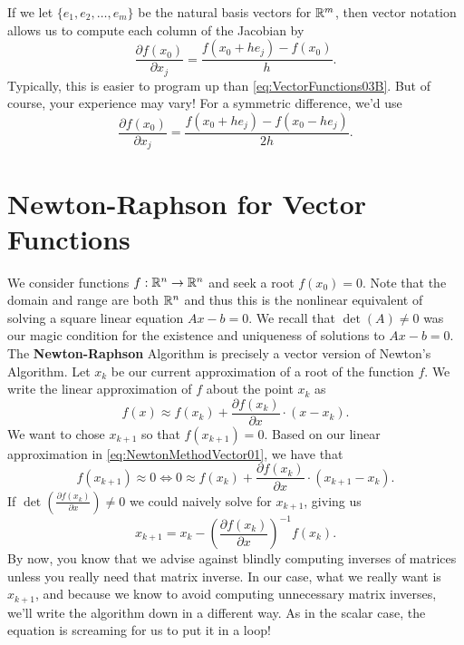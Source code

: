 \begin{tcolorbox}[title=\textbf{Compact Way to Numerically Approximate the Jacobian}]
If we let $\{e_1, e_2, \ldots, e_m \}$ be the natural basis vectors for $\mathbb R^m$, then vector notation allows us to compute each column of the Jacobian by 
\begin{equation}
    \label{eq:SummaryGradient01A}
    \frac{\partial f(x_0)}{\partial x_j} = \frac{f(x_0+h e_j)-f(x_0)}{h}.
    \end{equation}
    Typically, this is easier to program up than \eqref{eq:VectorFunctions03B}. But of course, your experience may vary! For a symmetric difference, we'd use
    \begin{equation}
    \label{eq:SummaryGradient01B}
    \frac{\partial f(x_0)}{\partial x_j} = \frac{f(x_0+h e_j)-f(x_0- h e_j)}{2h}.
    \end{equation}
\end{tcolorbox}



\section{Newton-Raphson for Vector Functions}
\label{sec:Newtonraphson}

We consider functions $f:\mathbb R^n \to \mathbb R^n$ and seek a root $f(x_0)=0$. Note that the domain and range are both $\mathbb R^n$ and thus this is the nonlinear equivalent of solving a square linear equation $Ax-b=0$. We recall that $\det(A)\neq 0$ was our magic condition for the existence and uniqueness of solutions to $Ax-b=0$. \\

The \textbf{Newton-Raphson} Algorithm is precisely a vector version of Newton's Algorithm. Let $x_k$ be our current approximation of a root of the function $f$. We write the linear approximation of $f$ about the point $x_k$ as
\begin{equation}
    \label{eq:NewtonMethodVector01}
    f(x) \approx f(x_k) + \frac{\partial f(x_k)}{\partial x}\cdot (x - x_k).
\end{equation}
We want to chose $x_{k+1}$ so that $f(x_{k+1})=0$. Based on our linear approximation in \eqref{eq:NewtonMethodVector01}, we have that 
\begin{equation}
    \label{eq:BasicNewtonRaphson}
     f(x_{k+1}) \approx 0 \iff  0  \approx f(x_k) + \frac{\partial f(x_k)}{\partial x}\cdot (x_{k+1} - x_k).
\end{equation}
If $\det\left(\frac{\partial f(x_k)}{\partial x} \right)\neq 0$  we could naively solve for $x_{k+1}$, giving us
$$ \boxed{    x_{k+1}=x_{k} - \left(   \frac{\partial f(x_k)}{\partial x}\right)^{-1} f(x_k).}$$
By now, you know that we advise against blindly computing inverses of matrices unless you really need that matrix inverse. In our case, what we really want is $x_{k+1}$, and because we know to avoid computing unnecessary matrix inverses, we'll write the algorithm down in a different way. 
As in the scalar case, the equation is screaming for us to put it in a loop!

